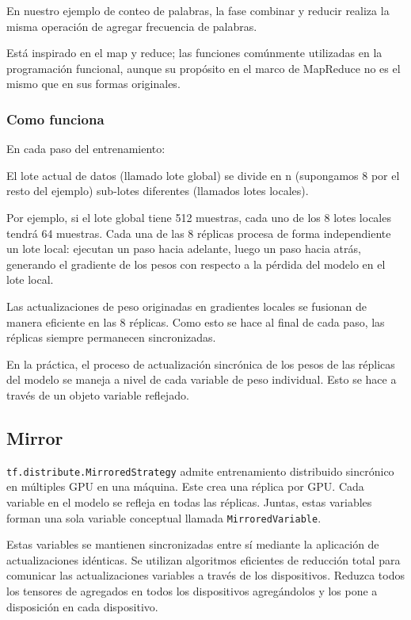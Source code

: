 \documentclass[10pt, fleqn, journal]{IEEEtran}
\theoremstyle{break}                                            %
\begin{document}
      En nuestro ejemplo de conteo de palabras, la fase combinar y reducir realiza la misma operación de 
      agregar frecuencia de palabras. 

      Está inspirado en el map y reduce; las funciones comúnmente utilizadas en la programación funcional, 
      aunque su propósito en el marco de MapReduce no es el mismo que en sus formas originales. 

      \subsubsection{Como funciona}

      En cada paso del entrenamiento:

      El lote actual de datos (llamado lote global) se divide en n (supongamos 8 por el resto del ejemplo) 
      sub-lotes diferentes (llamados lotes locales). 
      
      Por ejemplo, si el lote global tiene 512 muestras, cada uno de los 8 lotes locales tendrá 64 muestras.
      Cada una de las 8 réplicas procesa de forma independiente un lote local: ejecutan un paso hacia adelante,
      luego un paso hacia atrás, generando el gradiente de los pesos con respecto a la pérdida del modelo en 
      el lote local.

      Las actualizaciones de peso originadas en gradientes locales se fusionan de manera eficiente en las 
      8 réplicas. Como esto se hace al final de cada paso, las réplicas siempre permanecen sincronizadas.

      En la práctica, el proceso de actualización sincrónica de los pesos de las réplicas del modelo se 
      maneja a nivel de cada variable de peso individual. 
      Esto se hace a través de un objeto variable reflejado.

    \subsection{Mirror}

      \texttt{tf.distribute.MirroredStrategy}
      admite entrenamiento distribuido sincrónico en múltiples GPU en una máquina. 
      Este crea una réplica por GPU. Cada variable en el modelo se refleja en todas las réplicas. 
      Juntas, estas variables forman una sola variable conceptual llamada \texttt{MirroredVariable}. 
      
      Estas variables se mantienen sincronizadas entre sí mediante la aplicación de actualizaciones idénticas.
      Se utilizan algoritmos eficientes de reducción total para comunicar las actualizaciones variables a través 
      de los dispositivos. Reduzca todos los tensores de agregados en todos los dispositivos agregándolos 
      y los pone a disposición en cada dispositivo. 
      
\end{document}
